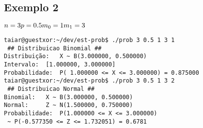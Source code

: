 \documentclass[12pt, a4paper]{article}
\begin{document}
\subsection{Exemplo 2}

$
n = 3     \\
p = 0.5     \\
m_0 = 1    \\
m_1 = 3
$

\begin{verbatim}
taiar@guestxor:~/dev/est-prob$ ./prob 3 0.5 1 3 1
 ## Distribuicao Binomial ##
Distribuição:   X ~ B(3.000000, 0.500000)
Intervalo:  [1.000000, 3.000000]
Probabilidade:  P( 1.000000 <= X <= 3.000000) = 0.875000
taiar@guestxor:~/dev/est-prob$ ./prob 3 0.5 1 3 2
 ## Distribuicao Normal ##
Binomial:   X ~ B(3.000000, 0.500000)
Normal:     Z ~ N(1.500000, 0.750000)
Probabilidade:  P(1.000000 <= X <= 3.000000)
 ~ P(-0.577350 <= Z <= 1.732051) = 0.6781
\end{verbatim}



\end{document}
